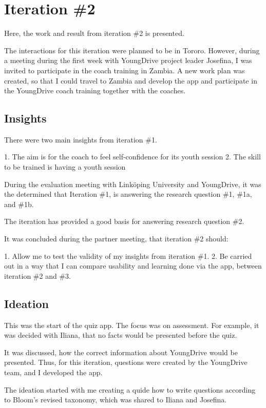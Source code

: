\section{Iteration \#2}
Here, the work and result from iteration \#2 is presented.

The interactions for this iteration were planned to be in Tororo. However, during a meeting during the first week with YoungDrive project leader Josefina, I was invited to participate in the coach training in Zambia. A new work plan was created, so that I could travel to Zambia and develop the app and participate in the YoungDrive coach training together with the coaches.

\subsection*{Insights}

There were two main insights from iteration \#1.

1. The aim is for the coach to feel self-confidence for its youth session
2. The skill to be trained is having a youth session

During the evaluation meeting with Linköping University and YoungDrive, it was the determined that Iteration \#1, is answering the research question \#1, \#1a, and \#1b.

The iteration has provided a good basis for answering research question \#2.

It was concluded during the partner meeting, that iteration \#2 should:

1. Allow me to test the validity of my insights from iteration \#1.
2. Be carried out in a way that I can compare usability and learning done via the app, between iteration \#2 and \#3.

\subsection*{Ideation}

This was the start of the quiz app. The focus was on assessment. For example, it was decided with Iliana, that no facts would be presented before the quiz.

It was discussed, how the correct information about YoungDrive would be presented. Thus, for this iteration, questions were created by the YoungDrive team, and I developed the app.

The ideation started with me creating a quide how to write questions according to Bloom's revised taxonomy, which was shared to Iliana and Josefina.

